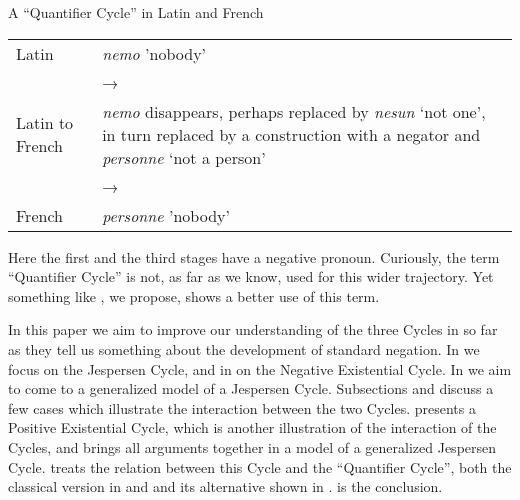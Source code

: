 ﻿\documentclass[output=paper]{langsci/langscibook}
\begin{document}
\begin{exe}\ex\label{ex:int-qc-latin}
A ``Quantifier Cycle'' in Latin and French\\[1ex]
%
\begin{tabularx}{.8\textwidth}{@{} l Q @{}}
Latin               &   \textit{nemo} 'nobody'\\
                    & → \\
Latin to French     &\textit{nemo} disappears,
  perhaps replaced by \textit{nesun} `not one', in turn replaced by a
  construction with a negator and \textit{personne} `not a
  person'\\
                    & →\\
French              & \textit{personne} 'nobody'
\end{tabularx}
\end{exe}

Here the first and the third stages have a negative pronoun. Curiously,
the term ``Quantifier Cycle'' is not, as far as we know, used for this
wider trajectory. Yet something like , we propose, shows a
better use of this term.

In this paper we aim to improve our understanding of the three Cycles in so
far as they tell us something about the development of standard negation.
In  we focus on the Jespersen Cycle, and in
 on the Negative Existential Cycle. In
 we aim to come to a generalized model of a Jespersen
Cycle. Subsections  and  discuss a few cases which illustrate the
interaction between the two Cycles.  presents a
Positive Existential Cycle, which is another illustration of the
interaction of the Cycles, and  brings all arguments
together in a model of a generalized Jespersen Cycle. 
treats the relation between this Cycle and the ``Quantifier Cycle'', both the
classical version in  and  and its alternative
shown in .  is the conclusion.
\end{document}
